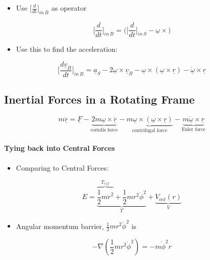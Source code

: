 \documentclass[a4paper,11pt,normalem]{article}
\begin{document}
\begin{itemize}
\item
  Use \(\Big[\frac{d}{dt}\Big]_{in\,B_{}}\) as operator
\end{itemize}

\[
    \Big[\frac{d}{dt}\Big]_{in\,B_{}} = \Bigg(\Big[\frac{d}{dt}\Big]_{in\,S_{}} - \underline{\omega} \times \Bigg)
\]

\begin{itemize}
\item
  Use this to find the acceleration:
\end{itemize}

\[
    \Big[\frac{d\underline{v}_B}{dt}\Big]_{in\,B_{}} = \underline{a}_S - 2\underline{\omega} \times \underline{v}_B - \underline{\omega} \times (\underline{\omega} \times \underline{r}) - \underline{\dot{\omega}} \times \underline{r}
\]

\subsection{Inertial Forces in a Rotating Frame}\label{inertial-forces-in-a-rotating-frame}

\[
    m\underline{\ddot{r}} = \underline{F} - \underbrace{2m\underline{\omega} \times \underline{\dot{r}}}_{\text{coriolis force}} - \underbrace{m\underline{\omega} \times (\underline{\omega} \times \underline{r})}_{\text{centrifugal force}} - \underbrace{m\underline{\dot{\omega}} \times \underline{r}}_{\text{Euler force}}
\]

\paragraph{Tying back into Central Forces}

\begin{itemize}
\item
  Comparing to Central Forces:
\end{itemize}

\[
    E = \underbrace{\overbrace{\frac{1}{2}m\dot{r}^2}^{T_{eff}} + \frac{1}{2}mr^2 \dot{\phi}^2}_{T} + \underbrace{V_{int}(r)}_{V}
\]

\begin{itemize}
\item
  Angular momentum barrier, \(\frac{1}{2}mr^2\dot{\phi}^2\) is
\end{itemize}

\[
    -\nabla (\frac{1}{2}mr^2 \dot{\phi}^2) = -m\dot{\phi}^2r
\]
\end{document}
